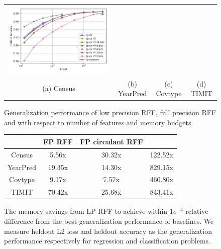 \begin{figure}
\begin{tabular}{c c c c}
		\includegraphics[width=0.24\linewidth]{figures/timit_accuracy_vs_n_feat.pdf} \\
		(a) Census & (b) YearPred & (c) Covtype & (d) TIMIT \\
	\end{tabular}
	\caption{Generalization performance of low precision RFF, full precision RFF and \Nystrom with respect to number of features and memory budgets.}
	\label{fig:generalizatio_col}
\end{figure}


\begin{figure}
	\centering
	\begin{tabular}{c c c c}
		\hline
		& FP RFF & FP circulant RFF & \Nystrom \\
		\hline
		\hline
		Census & 5.56x & 30.32x & 122.52x \\
		YearPred & 19.35x & 14.30x & 829.15x \\ 
		Covtype & 9.17x & 7.57x & 460.80x \\ 
		TIMIT & 70.42x & 25.68x & 843.41x \\ 
		\hline
	\end{tabular}
	\caption{The memory savings from LP RFF to achieve within $1e^{-4}$ relative difference from the best generalization performance of baselines. We measure heldout L2 loss and heldout accuracy as the generalization performance respectively for regression and classification problems.}
	\label{fig:mem_saving}
\end{figure}